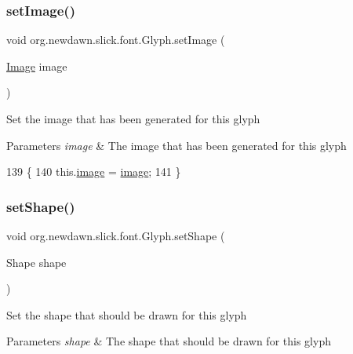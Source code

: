\subsubsection{\texorpdfstring{set\+Image()}{setImage()}}
{\footnotesize\ttfamily void org.\+newdawn.\+slick.\+font.\+Glyph.\+set\+Image (\begin{DoxyParamCaption}\item[{\mbox{\hyperlink{classorg_1_1newdawn_1_1slick_1_1_image}{Image}}}]{image }\end{DoxyParamCaption})\hspace{0.3cm}{\ttfamily [inline]}}

Set the image that has been generated for this glyph


\begin{DoxyParams}{Parameters}
{\em image} & The image that has been generated for this glyph \\
\hline
\end{DoxyParams}

\begin{DoxyCode}
139                                       \{
140         this.\mbox{\hyperlink{classorg_1_1newdawn_1_1slick_1_1font_1_1_glyph_af4fe8b4f2cdf72e687e7582fd5e210db}{image}} = \mbox{\hyperlink{classorg_1_1newdawn_1_1slick_1_1font_1_1_glyph_af4fe8b4f2cdf72e687e7582fd5e210db}{image}};
141     \}
\end{DoxyCode}
\mbox{\label{classorg_1_1newdawn_1_1slick_1_1font_1_1_glyph_ad8af498c35a839227c6b819ed6833a51}} 
\subsubsection{\texorpdfstring{set\+Shape()}{setShape()}}
{\footnotesize\ttfamily void org.\+newdawn.\+slick.\+font.\+Glyph.\+set\+Shape (\begin{DoxyParamCaption}\item[{Shape}]{shape }\end{DoxyParamCaption})\hspace{0.3cm}{\ttfamily [inline]}}

Set the shape that should be drawn for this glyph


\begin{DoxyParams}{Parameters}
{\em shape} & The shape that should be drawn for this glyph \\
\hline
\end{DoxyParams}

